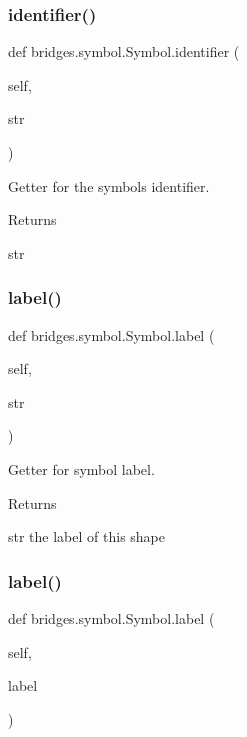\subsubsection{\texorpdfstring{identifier()}{identifier()}}
{\footnotesize\ttfamily def bridges.\+symbol.\+Symbol.\+identifier (\begin{DoxyParamCaption}\item[{}]{self,  }\item[{}]{str }\end{DoxyParamCaption})}



Getter for the symbols identifier. 

\begin{DoxyReturn}{Returns}


str 
\end{DoxyReturn}
\mbox{\label{classbridges_1_1symbol_1_1_symbol_a6e29aa07da4ce5b13130ada2688685fc}} 
\subsubsection{\texorpdfstring{label()}{label()}\hspace{0.1cm}{\footnotesize\ttfamily [1/2]}}
{\footnotesize\ttfamily def bridges.\+symbol.\+Symbol.\+label (\begin{DoxyParamCaption}\item[{}]{self,  }\item[{}]{str }\end{DoxyParamCaption})}



Getter for symbol label. 

\begin{DoxyReturn}{Returns}


str the label of this shape 
\end{DoxyReturn}
\mbox{\label{classbridges_1_1symbol_1_1_symbol_a44d41804267e94598d0a29ca1a29c3b1}} 
\subsubsection{\texorpdfstring{label()}{label()}\hspace{0.1cm}{\footnotesize\ttfamily [2/2]}}
{\footnotesize\ttfamily def bridges.\+symbol.\+Symbol.\+label (\begin{DoxyParamCaption}\item[{}]{self,  }\item[{}]{label }\end{DoxyParamCaption})}



